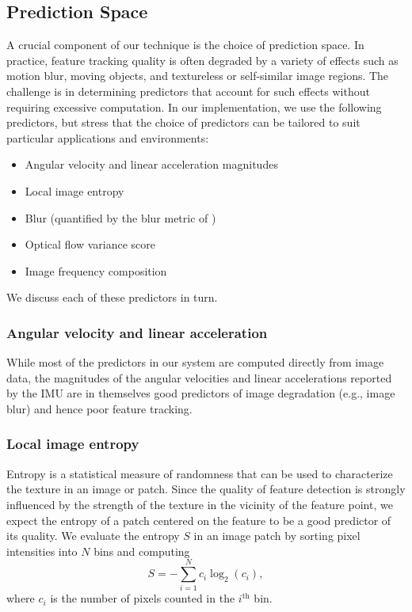 \documentclass[letterpaper, 10 pt, conference]{ieeeconf}  %
\begin{document}
\subsection{Prediction Space} \label{sec:predictors}
A crucial component of our technique is the choice of prediction space.
In practice, feature tracking quality is often degraded by a variety of effects such as motion blur, moving objects, and textureless or self-similar image regions.
The challenge is in determining predictors that account for such effects without requiring excessive computation.
In our implementation, we use the following predictors, but stress that the choice of predictors can be tailored to suit particular applications and environments:
\begin{itemize}
    \item Angular velocity and linear acceleration magnitudes
    \item Local image entropy
    \item Blur (quantified by the blur metric of \cite{Anonymous:Ngi3VEEU})
    \item Optical flow variance score
    \item Image frequency composition
\end{itemize}
We discuss each of these predictors in turn.


\subsubsection{Angular velocity and linear acceleration}
While most of the predictors in our system are computed directly from image data, the magnitudes of the angular velocities and linear accelerations reported by the IMU are in themselves good predictors of image degradation (e.g., image blur) and hence poor feature tracking. 

\subsubsection{Local image entropy}
Entropy is a statistical measure of randomness that can be used to characterize the texture in an image or patch.
Since the quality of feature detection is strongly influenced by the strength of the texture in the vicinity of the feature point, we expect the entropy of a patch centered on the feature to be a good predictor of its quality.
We evaluate the entropy $S$ in an image patch by sorting pixel intensities into $N$ bins and computing
\begin{equation}
    S = -\sum_{i=1}^N c_i \log_2(c_i),
\end{equation}
where $c_i$ is the number of pixels counted in the $i^\text{th}$ bin.
\end{document}
